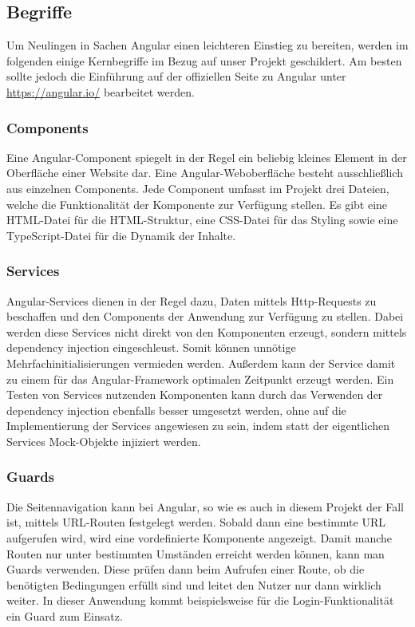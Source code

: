 \subsection{Begriffe}
Um Neulingen in Sachen Angular einen leichteren Einstieg zu bereiten, werden im folgenden einige Kernbegriffe im Bezug auf unser Projekt geschildert. Am besten sollte jedoch die Einführung auf der offiziellen Seite zu Angular unter \href{https://angular.io/}{https://angular.io/} bearbeitet werden.

\subsubsection{Components}
Eine Angular-Component spiegelt in der Regel ein beliebig kleines Element in der Oberfläche einer Website dar. Eine Angular-Weboberfläche besteht ausschließlich aus einzelnen Components. Jede Component umfasst im Projekt drei Dateien, welche die Funktionalität der Komponente zur Verfügung stellen. Es gibt eine \acs{HTML}-Datei für die \acs{HTML}-Struktur, eine \acs{CSS}-Datei für das Styling sowie eine TypeScript-Datei für die Dynamik der Inhalte. \cite{OWA18}

\subsubsection{Services}
Angular-Services dienen in der Regel dazu, Daten mittels Http-Requests zu beschaffen und den Components der Anwendung zur Verfügung zu stellen. Dabei werden diese Services nicht direkt von den Komponenten erzeugt, sondern mittels dependency injection eingeschleust. Somit können unnötige Mehrfachinitialisierungen vermieden werden. Außerdem kann der Service damit zu einem für das Angular-Framework optimalen Zeitpunkt erzeugt werden. Ein Testen von Services nutzenden Komponenten kann durch das Verwenden der dependency injection ebenfalls besser umgesetzt werden, ohne auf die Implementierung der Services angewiesen zu sein, indem statt der eigentlichen Services Mock-Objekte injiziert werden. \cite{OWA18}

\subsubsection{Guards}
Die Seitennavigation kann bei Angular, so wie es auch in diesem Projekt der Fall ist, mittels \acs{URL}-Routen festgelegt werden. Sobald dann eine bestimmte \acs{URL} aufgerufen wird, wird eine vordefinierte Komponente angezeigt. Damit manche Routen nur unter bestimmten Umständen erreicht werden können, kann man Guards verwenden. Diese prüfen dann beim Aufrufen einer Route, ob die benötigten Bedingungen erfüllt sind und leitet den Nutzer nur dann wirklich weiter. In dieser Anwendung kommt beispielsweise für die Login-Funktionalität ein Guard zum Einsatz. \cite{OWA18}

